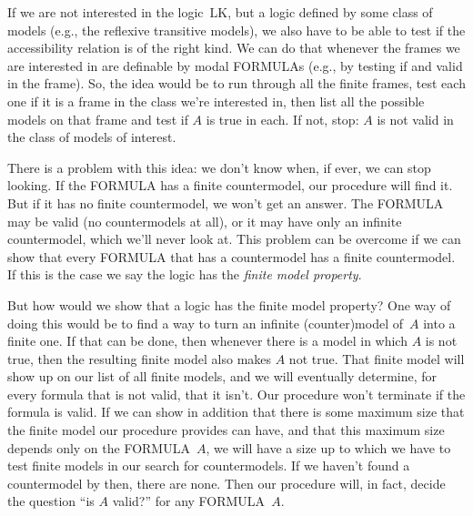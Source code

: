 \documentclass[10pt,a4paper]{article}
\newcommand*{\olup}[1]{\MakeUppercase{#1}}
\theoremstyle{plain}
\theoremstyle{definition}
\theoremstyle{remark}
\providecommand{\Log}{\ensuremath{\mathrm{L}}}
\providecommand{\Ax}{\mathrm{Ax}}
\begin{document}
If we are not interested in the logic~\Log{K}, but a logic defined by
some class of models (e.g., the reflexive transitive models), we also
have to be able to test if the accessibility relation is of the right
kind. We can do that whenever the frames we are interested in are
definable by modal \olup{formula}s (e.g., by testing if \Ax{T} and \Ax{4}
valid in the frame). So, the idea would be to run through all the
finite frames, test each one if it is a frame in the class we're
interested in, then list all the possible models on that frame and
test if $A$ is true in each. If not, stop: $A$ is not valid in the
class of models of interest.

There is a problem with this idea: we don't know when, if ever, we can
stop looking. If the \olup{formula} has a finite countermodel, our procedure will
find it. But if it has no finite countermodel, we won't get an
answer. The \olup{formula} may be valid (no countermodels at all), or it
may have only an infinite countermodel, which we'll never look at. This
problem can be overcome if we can show that every \olup{formula} that has
a countermodel has a finite countermodel. If this is the case we say
the logic has the \emph{finite model property}.

But how would we show that a logic has the finite model property? One
way of doing this would be to find a way to turn an infinite
(counter)model of~$A$ into a finite one. If that can be done, then
whenever there is a model in which $A$ is not true, then the
resulting finite model also makes $A$ not true. That finite model
will show up on our list of all finite models, and we will eventually
determine, for every formula that is not valid, that it isn't. Our
procedure won't terminate if the formula is valid. If we can show in
addition that there is some maximum size that the finite model our
procedure provides can have, and that this maximum size depends only
on the \olup{formula}~$A$, we will have a size up to which we have to
test finite models in our search for countermodels. If we haven't
found a countermodel by then, there are none. Then our procedure will,
in fact, decide the question ``is $A$ valid?'' for any
\olup{formula}~$A$.
\end{document}
